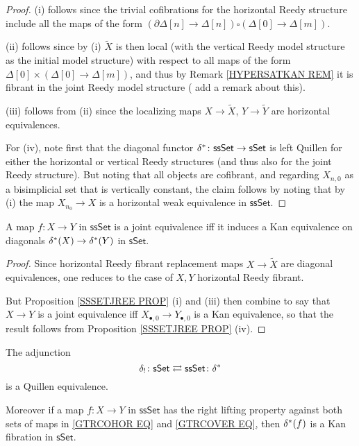 \documentclass[a4paper,10pt,draft]{article}%
\numberwithin{equation}{section}%
\numberwithin{figure}{section}
\begin{document}
\begin{proof}
(i) follows since the trivial cofibrations for the horizontal Reedy structure include all the maps of the form
$(\partial \Delta[n] \to \Delta[n]) \square (\Delta[0] \to \Delta[m])$.

(ii) follows since by (i) $\tilde{X}$ is then local
(with the vertical Reedy model structure as the initial model structure)
with respect to all maps of the form
$\Delta[0] \times (\Delta[0] \to \Delta[m])$,
and thus by Remark \ref{HYPERSATKAN REM}
it is fibrant in the joint Reedy model structure ({\color{blue} add a remark about this}).

(iii) follows from (ii) since the localizing maps 
$X \to \tilde{X}$, $Y \to \tilde{Y}$
are horizontal equivalences.

For (iv), note first that the diagonal functor
$\delta^{\**} \colon \mathsf{ssSet} \to \mathsf{sSet}$
is left Quillen for either the horizontal or vertical Reedy structures (and thus also for the joint Reedy structure). But noting that all objects are cofibrant, and regarding 
$X_{n,0}$ as a bisimplicial set that is vertically constant, the claim
follows by noting that by (i) the map
$X_{n_0} \to X$ is a horizontal weak equivalence in $\mathsf{ssSet}$.
\end{proof}

\begin{corollary}\label{WEAKDIAG COR}
	A map $f\colon X \to Y$ in $\mathsf{ssSet}$ is a joint equivalence iff it induces a Kan equivalence on diagonals
	$\delta^{\**}(X) \to \delta^{\**}(Y)$ in $\mathsf{sSet}$.
\end{corollary}

\begin{proof}
	Since horizontal Reedy fibrant replacement maps
	$X \to \tilde{X}$ are diagonal equivalences, 
	one reduces to the case of $X,Y$ horizontal Reedy fibrant.
	
	But Proposition \ref{SSSETJREE PROP} (i) and (iii) then combine to say that $X \to Y$ is a joint equivalence iff
	$X_{\bullet,0} \to Y_{\bullet,0}$ is a Kan equivalence, 
	so that the result follows from Proposition \ref{SSSETJREE PROP} (iv).
\end{proof}

\begin{corollary}\label{SSETSSETADJ COR}
	The adjunction
\[
	\delta_{!}\colon \mathsf{sSet} 
		\rightleftarrows 
	\mathsf{ssSet} \colon \delta^{\**}
\]
is a Quillen equivalence.

Moreover if a map $f\colon X \to Y$ in $\mathsf{ssSet}$ has the right lifting property
against both sets of maps in
\eqref{GTRCOHOR EQ} and \eqref{GTRCOVER EQ}, then
$\delta^{\**} (f)$ is a Kan fibration in $\mathsf{sSet}$.
\end{corollary}
\end{document}
